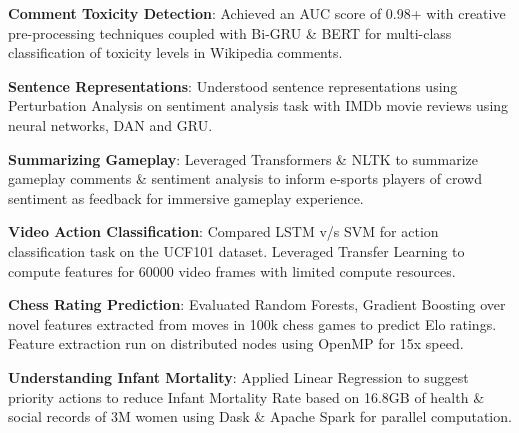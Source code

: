 \documentclass[letterpaper,10pt]{article}
\newcommand{\resumeItem}[2]{
	\item\normalsize{
		\textbf{#1}{: #2}
	}\vspace{-2pt}
}
\newcommand{\resumeItemText}[1]{
	\item\normalsize{
		{#1}
	}\vspace{-2pt}
}
\newcommand{\resumeSubItem}[2]{\resumeItem{#1}{#2}\vspace{0pt}}
\newcommand{\resumeSubItemText}[1]{\resumeItemText{#1}\vspace{-2pt}}
\begin{document}
	\resumeSubItem{Comment Toxicity Detection}{Achieved an AUC score of 0.98+ with creative pre-processing techniques coupled with Bi-GRU \& BERT for multi-class classification of toxicity levels in Wikipedia comments.}
	\resumeSubItem{Sentence Representations}{Understood sentence representations using Perturbation Analysis on sentiment analysis task with IMDb movie reviews using neural networks, DAN and GRU.}
	\resumeSubItem{Summarizing Gameplay}{Leveraged Transformers \& NLTK to summarize gameplay comments \& sentiment analysis to inform e-sports players of crowd sentiment as feedback for immersive gameplay experience.}
	\resumeSubItem{Video Action Classification}{Compared LSTM v/s SVM for action classification task on the UCF101 dataset. Leveraged Transfer Learning to compute features for 60000 video frames with limited compute resources.}
	\resumeSubItem{Chess Rating Prediction}{Evaluated Random Forests, Gradient Boosting over novel features extracted from moves in 100k chess games to predict Elo ratings. Feature extraction run on distributed nodes using OpenMP for 15x speed.}
	\resumeSubItem{Understanding Infant Mortality}{Applied Linear Regression to suggest priority actions to reduce Infant Mortality Rate based on 16.8GB of health \& social records of 3M women using Dask \& Apache Spark for parallel computation.}
	
\end{document}
